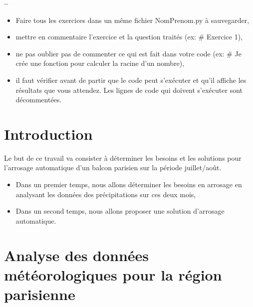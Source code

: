 


\begin{center}
{\Large\bf {\type} \no {\numero} -- \descrip}
\end{center}



\begin{boxedminipage}{.9\textwidth} 
\begin{itemize}
 \item Faire tous les exercices dans un même fichier {NomPrenom.py} à sauvegarder,
 \item mettre en commentaire l'exercice et la question traités (ex: \# Exercice 1),
 \item ne pas oublier pas de commenter ce qui est fait dans votre code (ex: \# Je crée une fonction pour calculer la racine d'un nombre),
 \item il faut vérifier avant de partir que le code peut s'exécuter et qu'il affiche les résultats que vous attendez. Les lignes de code qui doivent s'exécuter sont décommentées.
\end{itemize}
\end{boxedminipage}

\section*{Introduction}

Le but de ce travail va consister à déterminer les besoins et les solutions pour l'arrosage automatique d'un balcon parisien sur la période juillet/août.

\begin{itemize}
 \item Dans un premier temps, nous allons déterminer les besoins en arrosage en analysant les données des précipitations sur ces deux mois,
 \item Dans un second temps, nous allons proposer une solution d'arrosage automatique.
\end{itemize}

\section{Analyse des données météorologiques pour la région parisienne}

